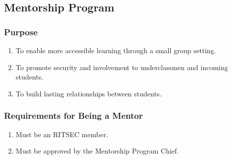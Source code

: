 \subsection{Mentorship Program}

\subsubsection{Purpose}

\begin{enumerate}
  \item To enable more accessible learning through a small group setting.
  \item To promote security and involvement to underclassmen and incoming
    students.
  \item To build lasting relationships between students.
\end{enumerate}

\subsubsection{Requirements for Being a Mentor}

\begin{enumerate}
  \item Must be an RITSEC member.
  \item Must be approved by the Mentorship Program Chief.
\end{enumerate}
